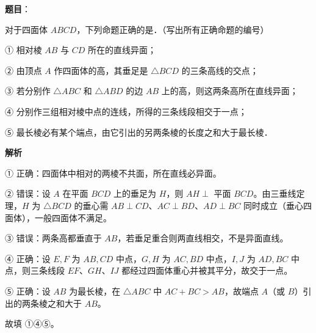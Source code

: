 \begin{answer}

\textbf{题目}：

对于四面体 $ABCD$，下列命题正确的是\gkblank{}．（写出所有正确命题的编号）

① 相对棱 $AB$ 与 $CD$ 所在的直线异面；

② 由顶点 $A$ 作四面体的高，其垂足是 $\triangle BCD$ 的三条高线的交点；

③ 若分别作 $\triangle ABC$ 和 $\triangle ABD$ 的边 $AB$ 上的高，则这两条高所在直线异面；

④ 分别作三组相对棱中点的连线，所得的三条线段相交于一点；

⑤ 最长棱必有某个端点，由它引出的另两条棱的长度之和大于最长棱．

\textbf{解析}

① 正确：四面体中相对的两棱不共面，所在直线必异面。

② 错误：设 $A$ 在平面 $BCD$ 上的垂足为 $H$，则 $AH\perp$ 平面 $BCD$。由三垂线定理，$H$ 为 $\triangle BCD$ 的垂心需 $AB\perp CD$、$AC\perp BD$、$AD\perp BC$ 同时成立（垂心四面体），一般四面体不满足。

③ 错误：两条高都垂直于 $AB$，若垂足重合则两直线相交，不是异面直线。

④ 正确：设 $E,F$ 为 $AB,CD$ 中点，$G,H$ 为 $AC,BD$ 中点，$I,J$ 为 $AD,BC$ 中点，则三条线段 $EF$、$GH$、$IJ$ 都经过四面体重心并被其平分，故交于一点。

⑤ 正确：设 $AB$ 为最长棱，在 $\triangle ABC$ 中 $AC+BC>AB$，故端点 $A$（或 $B$）引出的两条棱之和大于 $AB$。

故填 ①④⑤。


\end{answer}
